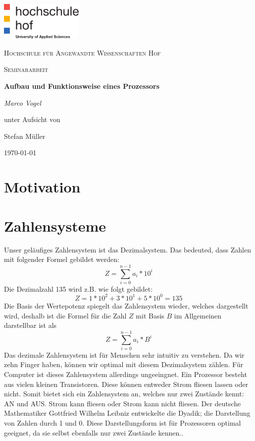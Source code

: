 \documentclass[12pt]{article}
\begin{document}
\begin{titlepage}
	\centering
	\includegraphics[width=0.3\textwidth]{logo}\par\vspace{1cm}
	{\scshape\LARGE Hochschule für Angewandte Wissenschaften Hof \par}
	\vspace{1cm}
	{\scshape\Large Seminararbeit\par}
	\vspace{1.5cm}
	{\huge\bfseries Aufbau und Funktionsweise eines Prozessors\par}
	\vspace{2cm}
	{\Large\itshape Marco Vogel\par}
	\vfill
	unter Aufsicht von\par
	Stefan Müller
	\vfill
	{\large\today\par}
\end{titlepage}
\newpage


\tableofcontents
\newpage





\section{Motivation}


\section{Zahlensysteme}
Unser geläufiges Zahlensystem ist das Dezimalsystem. Das bedeuted, dass Zahlen mit folgender Formel gebildet werden:
$$Z=\sum\limits_{i=0}^{n-1} a_i * 10^i$$
Die Dezimalzahl 135 wird z.B. wie folgt gebildet:$$Z=1*10^2+3*10^1+5*10^0 = 135$$
Die Basis der Wertepotenz spiegelt das Zahlensystem wieder, welches dargestellt wird, deshalb ist die Formel für die Zahl $Z$ mit Basis $B$ im Allgemeinen darstellbar ist als
$$Z=\sum\limits_{i=0}^{n-1} a_i * B^i$$
Das dezimale Zahlensystem ist für Menschen sehr intuitiv zu verstehen. Da wir zehn Finger haben, können wir optimal mit diesem Dezimalsystem zählen. Für Computer ist dieses Zahlensystem allerdings ungeeingnet. Ein Prozessor besteht aus vielen kleinen Transistoren. Diese können entweder Strom fliesen lassen oder nicht. Somit bietet sich ein Zahlensystem an, welches nur zwei Zustände kennt: AN und AUS. Strom kann fliesen oder Strom kann nicht fliesen. Der deutsche Mathematiker Gottfried Wilhelm Leibniz entwickelte die Dyadik; die Darstellung von Zahlen durch 1 und 0. Diese Darstellungsform ist für Prozessoren optimal geeignet, da sie selbst ebenfalls nur zwei Zustände kennen.\cite{wiki:dual}.
\end{document}
